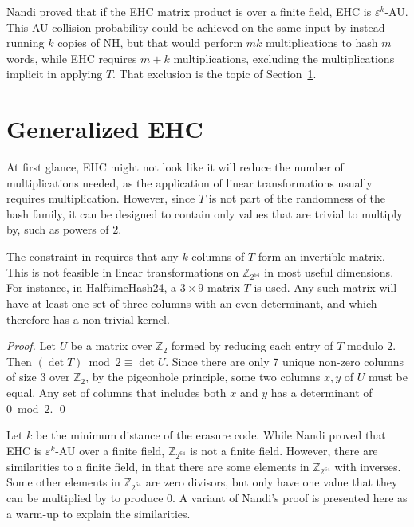 \documentclass{llncs}
\newcommand{\ints}{\mathbb{Z}}
\begin{document}
Nandi proved that if the EHC matrix product is over a finite field, EHC is $\varepsilon^k$-AU.
This AU collision probability could be achieved on the same input by instead running $k$ copies of NH, but that would perform $m k$ multiplications to hash $m$ words, while EHC requires $m + k$ multiplications, excluding the multiplications implicit in applying $T$.
That exclusion is the topic of Section~\ref{gehc}.

\section{Generalized EHC}
\label{gehc}

At first glance, EHC might not look like it will reduce the number of multiplications needed, as the application of linear transformations usually requires multiplication.
However, since $T$ is not part of the randomness of the hash family, it can be designed to contain only values that are trivial to multiply by, such as powers of $2$.

The constraint in \cite{ehc-nandi} requires that any $k$ columns of $T$ form an invertible matrix.
This is not feasible in linear transformations on $\ints_{2^{64}}$ in most useful dimensions.
For instance, in HalftimeHash24, a $3 \times 9$ matrix $T$ is used.
Any such matrix will have at least one set of three columns with an even determinant, and which therefore has a non-trivial kernel.

\begin{proof}
  Let $U$ be a matrix over $\ints_2$ formed by reducing each entry of $T$ modulo $2$.
  Then $(\det T) \bmod 2 \equiv \det U$.
  Since there are only 7 unique non-zero columns of size 3 over $\ints_2$, by the pigeonhole principle, some two columns $x, y$ of $U$ must be equal.
  Any set of columns that includes both $x$ and $y$ has a determinant of $0 \bmod 2$.
  \qed
\end{proof}


Let $k$ be the minimum distance of the erasure code.
While Nandi proved that EHC is $\varepsilon^k$-AU over a finite field, $\ints_{2^{64}}$ is not a finite field.
However, there are similarities to a finite field, in that there are some elements in $\ints_{2^{64}}$ with inverses.
Some other elements in $\ints_{2^{64}}$ are zero divisors, but only have one value that they can be multiplied by to produce 0.
A variant of Nandi's proof is presented here as a warm-up to explain the similarities. \cite{ehc-nandi}
\end{document}
